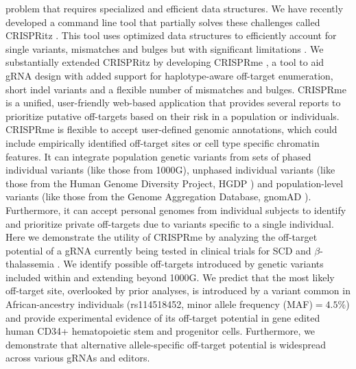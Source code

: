\documentclass[a4paper, titlepage, openright]{book}
\begin{document}
problem that requires specialized and efficient data structures. We have recently developed a command line tool that partially solves these challenges called CRISPRitz \citep{cancellieri2020crispritz}. This tool uses optimized data structures to efficiently account for single variants, mismatches and bulges but with significant limitations \citep{cancellieri2020crispritz}. We substantially extended CRISPRitz by developing CRISPRme \citep{cancellieri2022human}, a tool to aid gRNA design with added support for haplotype-aware off-target enumeration, short indel variants and a flexible number of mismatches and bulges. CRISPRme is a unified, user-friendly web-based application that provides several reports to prioritize putative off-targets based on their risk in a population or individuals. CRISPRme is flexible to accept user-defined genomic annotations, which could include empirically identified off-target sites or cell type specific chromatin features. It can integrate population genetic variants from sets of phased individual variants (like those from 1000G), unphased individual variants (like those from the Human Genome Diversity Project, HGDP \citep{bergstrom2020insights}) and population-level variants (like those from the Genome Aggregation Database, gnomAD \citep{karczewski2020mutational}). Furthermore, it can accept personal genomes from individual subjects to identify and prioritize private off-targets due to variants specific to a single individual. Here we demonstrate the utility of CRISPRme by analyzing the off-target potential of a gRNA currently being tested in clinical trials for SCD and $\beta$-thalassemia \citep{frangoul2021crispr,canver2015bcl11a,wu2019highly}. We identify possible off-targets introduced by genetic variants included within and extending beyond 1000G. We predict that the most likely off-target site, overlooked by prior analyses, is introduced by a variant common in African-ancestry individuals (rs114518452, minor allele frequency (MAF)$=4.5\%$) and provide experimental evidence of its off-target potential in gene edited human CD34+ hematopoietic stem and progenitor cells. Furthermore, we demonstrate that alternative allele-specific off-target potential is widespread across various gRNAs and editors.
\end{document}
